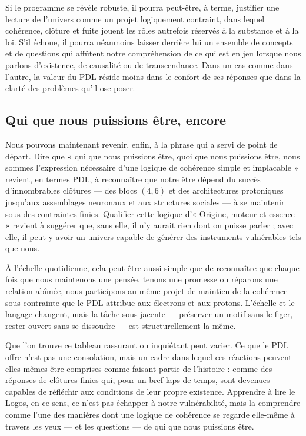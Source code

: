 \documentclass[11pt,a4paper]{article}
\theoremstyle{definition}
\begin{document}
Si le programme se révèle robuste, il pourra peut-être, à terme, justifier une lecture de l’univers comme un projet logiquement contraint, dans lequel cohérence, clôture et fuite jouent les rôles autrefois réservés à la substance et à la loi. S’il échoue, il pourra néanmoins laisser derrière lui un ensemble de concepts et de questions qui affûtent notre compréhension de ce qui est en jeu lorsque nous parlons d’existence, de causalité ou de transcendance. Dans un cas comme dans l’autre, la valeur du PDL réside moins dans le confort de ses réponses que dans la clarté des problèmes qu’il ose poser.

\subsection{Qui que nous puissions être, encore}

Nous pouvons maintenant revenir, enfin, à la phrase qui a servi de point de départ. Dire que « qui que nous puissions être, quoi que nous puissions être, nous sommes l’expression nécessaire d’une logique de cohérence simple et implacable » revient, en termes PDL, à reconnaître que notre être dépend du succès d’innombrables clôtures — des blocs \((4,6)\) et des architectures protoniques jusqu’aux assemblages neuronaux et aux structures sociales — à se maintenir sous des contraintes finies.\cite{Laubscher_EmergencePhysicalReality_2024,Laubscher_ProtonArch_v2_2024,Laubscher_Existence_PulsatingClosure_2026} Qualifier cette logique d’« Origine, moteur et essence » revient à suggérer que, sans elle, il n’y aurait rien dont on puisse parler ; avec elle, il peut y avoir un univers capable de générer des instruments vulnérables tels que nous.

À l’échelle quotidienne, cela peut être aussi simple que de reconnaître que chaque fois que nous maintenons une pensée, tenons une promesse ou réparons une relation abîmée, nous participons au même projet de maintien de la cohérence sous contrainte que le PDL attribue aux électrons et aux protons. L’échelle et le langage changent, mais la tâche sous-jacente — préserver un motif sans le figer, rester ouvert sans se dissoudre — est structurellement la même.

Que l’on trouve ce tableau rassurant ou inquiétant peut varier. Ce que le PDL offre n’est pas une consolation, mais un cadre dans lequel ces réactions peuvent elles-mêmes être comprises comme faisant partie de l’histoire : comme des réponses de clôtures finies qui, pour un bref laps de temps, sont devenues capables de réfléchir aux conditions de leur propre existence. Apprendre à lire le Logos, en ce sens, ce n’est pas échapper à notre vulnérabilité, mais la comprendre comme l’une des manières dont une logique de cohérence se regarde elle-même à travers les yeux — et les questions — de qui que nous puissions être.



\end{document}
